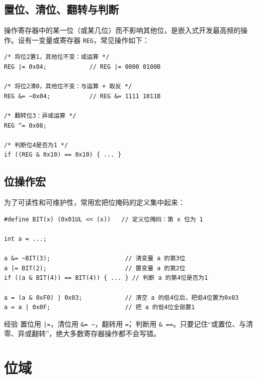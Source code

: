 \subsection{置位、清位、翻转与判断}

操作寄存器中的某一位（或某几位）而不影响其他位，是嵌入式开发最高频的操作。设有一变量或寄存器 \texttt{REG}，常见操作如下：

\begin{lstlisting}[style=c]
/* 将位2置1，其他位不变：或运算 */
REG |= 0x04;            // REG |= 0000 0100B

/* 将位2清0，其他位不变：与运算 + 取反 */
REG &= ~0x04;           // REG &= 1111 1011B

/* 翻转位3：异或运算 */
REG ^= 0x08;

/* 判断位4是否为1 */
if ((REG & 0x10) == 0x10) { ... }
\end{lstlisting}

\subsection{位操作宏}

为了可读性和可维护性，常用宏把位掩码的定义集中起来：

\begin{lstlisting}[style=c]
#define BIT(x) (0x01UL << (x))   // 定义位掩码：第 x 位为 1

int a = ...;

a &= ~BIT(3);                     // 清变量 a 的第3位
a |= BIT(2);                      // 置变量 a 的第2位
if ((a & BIT(4)) == BIT(4)) { ... } // 判断 a 的第4位是否为1

a = (a & 0xF0) | 0x03;            // 清空 a 的低4位后，把低4位置为0x03
a = a | 0x0F;                     // 把 a 的低4位全部置1
\end{lstlisting}

\begin{anybox}{经验}
置位用 \texttt{|=}，清位用 \texttt{\&= \~}，翻转用 \texttt{\^=}，判断用 \texttt{\& ==}。只要记住“或置位、与清零、异或翻转”，绝大多数寄存器操作都不会写错。
\end{anybox}
\section{位域}

